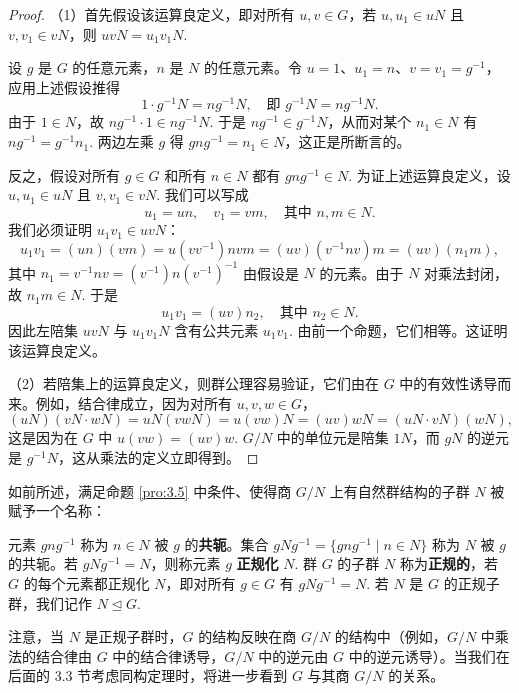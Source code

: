 \begin{proof}
（1）首先假设该运算良定义，即对所有 \(u, v \in G\)，若 \(u, u_1 \in uN\) 且 \(v, v_1 \in vN\)，则 \(uvN = u_1 v_1 N\).

设 \(g\) 是 \(G\) 的任意元素，\(n\) 是 \(N\) 的任意元素。令 \(u = 1\)、\(u_1 = n\)、\(v = v_1 = g^{-1}\)，应用上述假设推得
\[
1 \cdot g^{-1}N = ng^{-1}N, \quad \text{即 } g^{-1}N = ng^{-1}N.
\]
由于 \(1 \in N\)，故 \(ng^{-1} \cdot 1 \in ng^{-1}N\). 于是 \(ng^{-1} \in g^{-1}N\)，从而对某个 \(n_1 \in N\) 有 \(ng^{-1} = g^{-1}n_1\). 两边左乘 \(g\) 得 \(gng^{-1} = n_1 \in N\)，这正是所断言的。

反之，假设对所有 \(g \in G\) 和所有 \(n \in N\) 都有 \(gng^{-1} \in N\). 为证上述运算良定义，设 \(u, u_1 \in uN\) 且 \(v, v_1 \in vN\). 我们可以写成
\[
u_1 = un, \quad v_1 = vm, \quad \text{其中 } n, m \in N.
\]
我们必须证明 \(u_1 v_1 \in uvN\)：
\[
u_1 v_1 = (un)(vm) = u(vv^{-1})nvm = (uv)(v^{-1}nv)m = (uv)(n_1 m),
\]
其中 \(n_1 = v^{-1}nv = (v^{-1})n(v^{-1})^{-1}\) 由假设是 \(N\) 的元素。由于 \(N\) 对乘法封闭，故 \(n_1 m \in N\). 于是
\[
u_1 v_1 = (uv)n_2, \quad \text{其中 } n_2 \in N.
\]
因此左陪集 \(uvN\) 与 \(u_1 v_1 N\) 含有公共元素 \(u_1 v_1\). 由前一个命题，它们相等。这证明该运算良定义。

（2）若陪集上的运算良定义，则群公理容易验证，它们由在 \(G\) 中的有效性诱导而来。例如，结合律成立，因为对所有 \(u, v, w \in G\)，
\[
(uN)(vN \cdot wN) = uN(vwN) = u(vw)N = (uv)wN = (uN \cdot vN)(wN),
\]
这是因为在 \(G\) 中 \(u(vw) = (uv)w\). \(G/N\) 中的单位元是陪集 \(1N\)，而 \(gN\) 的逆元是 \(g^{-1}N\)，这从乘法的定义立即得到。
\end{proof}

如前所述，满足命题 \ref{pro:3.5} 中条件、使得商 \(G/N\) 上有自然群结构的子群 \(N\) 被赋予一个名称：

\begin{definition}
元素 \(gng^{-1}\) 称为 \(n \in N\) 被 \(g\) 的\textbf{共轭}。集合 \(gNg^{-1} = \{gng^{-1} \mid n \in N\}\) 称为 \(N\) 被 \(g\) 的共轭。若 \(gNg^{-1} = N\)，则称元素 \(g\) \textbf{正规化} \(N\). 群 \(G\) 的子群 \(N\) 称为\textbf{正规的}，若 \(G\) 的每个元素都正规化 \(N\)，即对所有 \(g \in G\) 有 \(gNg^{-1} = N\). 若 \(N\) 是 \(G\) 的正规子群，我们记作 \(N \trianglelefteq G\).
\end{definition}

注意，当 \(N\) 是正规子群时，\(G\) 的结构反映在商 \(G/N\) 的结构中（例如，\(G/N\) 中乘法的结合律由 \(G\) 中的结合律诱导，\(G/N\) 中的逆元由 \(G\) 中的逆元诱导）。当我们在后面的 3.3 节考虑同构定理时，将进一步看到 \(G\) 与其商 \(G/N\) 的关系。

